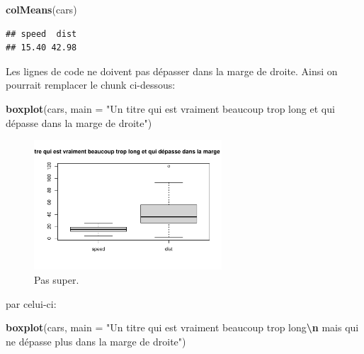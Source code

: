 \documentclass[mstat,12pt]{unswthesis}
\newenvironment{Shaded}{\begin{snugshade}}{\end{snugshade}}
\newcommand{\AttributeTok}[1]{\textcolor[rgb]{0.13,0.29,0.53}{#1}}
\newcommand{\FunctionTok}[1]{\textcolor[rgb]{0.13,0.29,0.53}{\textbf{#1}}}
\newcommand{\NormalTok}[1]{#1}
\newcommand{\SpecialCharTok}[1]{\textcolor[rgb]{0.81,0.36,0.00}{\textbf{#1}}}
\newcommand{\StringTok}[1]{\textcolor[rgb]{0.31,0.60,0.02}{#1}}
\begin{document}
\begin{Shaded}
\begin{Highlighting}[]
\FunctionTok{colMeans}\NormalTok{(cars)}
\end{Highlighting}
\end{Shaded}

\begin{verbatim}
## speed  dist 
## 15.40 42.98
\end{verbatim}

Les lignes de code ne doivent pas dépasser dans la marge de droite.
Ainsi on pourrait remplacer le chunk ci-dessous:

\begin{Shaded}
\begin{Highlighting}[]
\FunctionTok{boxplot}\NormalTok{(cars, }\AttributeTok{main =} \StringTok{"Un titre qui est vraiment beaucoup trop long et qui dépasse dans la marge de droite"}\NormalTok{)}
\end{Highlighting}
\end{Shaded}

\begin{figure}

{\centering \includegraphics[width=7cm]{scdon2-UPV-report-template_sansPython_files/figure-latex/unnamed-chunk-2-1} 

}

\caption{Pas super.}\label{fig:unnamed-chunk-2}
\end{figure}

par celui-ci:

\tiny

\begin{Shaded}
\begin{Highlighting}[]
\FunctionTok{boxplot}\NormalTok{(cars, }
        \AttributeTok{main =} \StringTok{"Un titre qui est vraiment beaucoup trop long}\SpecialCharTok{\textbackslash{}n}\StringTok{ mais qui ne dépasse plus dans la marge de droite"}\NormalTok{)}
\end{Highlighting}
\end{Shaded}
\end{document}
